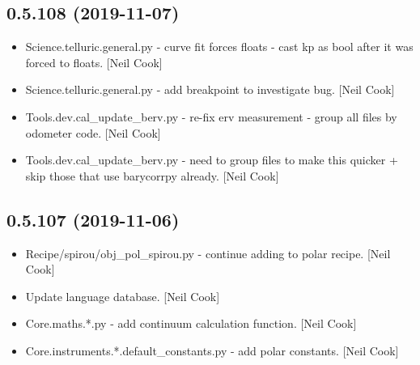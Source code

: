 \documentclass[a4paper,10pt,english]{report}
\begin{document}
\subsection{0.5.108 (2019-11-07)}
\label{\detokenize{misc/changelog:id33}}\begin{itemize}
\item {} 
Science.telluric.general.py - curve fit forces floats - cast kp as
bool after it was forced to floats. {[}Neil Cook{]}

\item {} 
Science.telluric.general.py - add breakpoint to investigate bug. {[}Neil
Cook{]}

\item {} 
Tools.dev.cal\_update\_berv.py - re-fix erv measurement - group all
files by odometer code. {[}Neil Cook{]}

\item {} 
Tools.dev.cal\_update\_berv.py - need to group files to make this
quicker + skip those that use barycorrpy already. {[}Neil Cook{]}

\end{itemize}


\subsection{0.5.107 (2019-11-06)}
\label{\detokenize{misc/changelog:id34}}\begin{itemize}
\item {} 
Recipe/spirou/obj\_pol\_spirou.py - continue adding to polar recipe.
{[}Neil Cook{]}

\item {} 
Update language database. {[}Neil Cook{]}

\item {} 
Core.maths.*.py - add continuum calculation function. {[}Neil Cook{]}

\item {} 
Core.instruments.*.default\_constants.py - add polar constants. {[}Neil
Cook{]}

\end{itemize}
\end{document}
